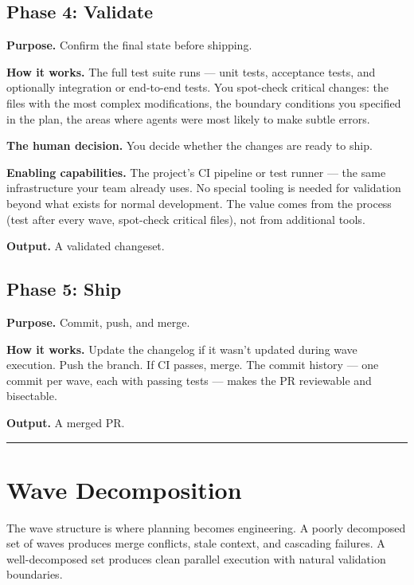 \documentclass[
  a4paper,
  DIV=11,
  numbers=noendperiod]{scrreprt}
\begin{document}
\subsection{Phase 4: Validate}\label{phase-4-validate}

\textbf{Purpose.} Confirm the final state before shipping.

\textbf{How it works.} The full test suite runs --- unit tests,
acceptance tests, and optionally integration or end-to-end tests. You
spot-check critical changes: the files with the most complex
modifications, the boundary conditions you specified in the plan, the
areas where agents were most likely to make subtle errors.

\textbf{The human decision.} You decide whether the changes are ready to
ship.

\textbf{Enabling capabilities.} The project's CI pipeline or test runner
--- the same infrastructure your team already uses. No special tooling
is needed for validation beyond what exists for normal development. The
value comes from the process (test after every wave, spot-check critical
files), not from additional tools.

\textbf{Output.} A validated changeset.

\subsection{Phase 5: Ship}\label{phase-5-ship}

\textbf{Purpose.} Commit, push, and merge.

\textbf{How it works.} Update the changelog if it wasn't updated during
wave execution. Push the branch. If CI passes, merge. The commit history
--- one commit per wave, each with passing tests --- makes the PR
reviewable and bisectable.

\textbf{Output.} A merged PR.

\begin{center}\rule{0.5\linewidth}{0.5pt}\end{center}

\section{Wave Decomposition}\label{wave-decomposition}

The wave structure is where planning becomes engineering. A poorly
decomposed set of waves produces merge conflicts, stale context, and
cascading failures. A well-decomposed set produces clean parallel
execution with natural validation boundaries.
\end{document}
